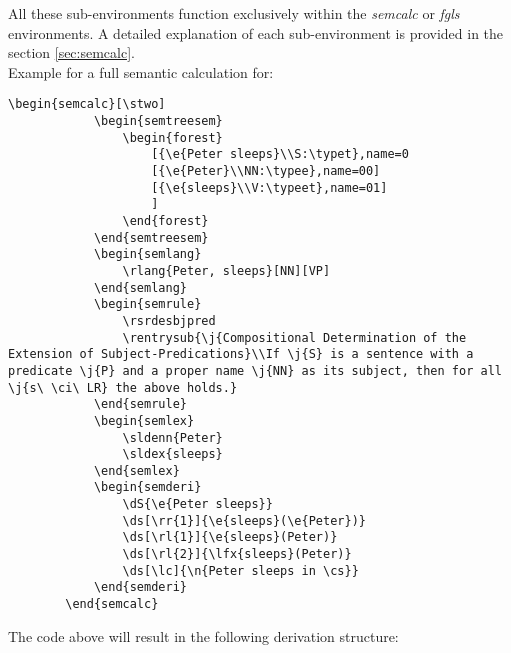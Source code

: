 \documentclass[10pt, a4paper]{article}
\begin{document}
	All these sub-environments function exclusively within the \textit{semcalc} or \textit{fgls} environments. A detailed ex\-pla\-na\-ti\-on of each sub-environment is provided in the section \ref{sec:semcalc}.
	\\Example for a full semantic calculation for: 
	\begin{lstlisting}[style=B]
		\begin{semcalc}[\stwo]
			\begin{semtreesem}
				\begin{forest}
					[{\e{Peter sleeps}\\S:\typet},name=0
					[{\e{Peter}\\NN:\typee},name=00]
					[{\e{sleeps}\\V:\typeet},name=01]
					]
				\end{forest}
			\end{semtreesem}
			\begin{semlang}
				\rlang{Peter, sleeps}[NN][VP]
			\end{semlang}
			\begin{semrule}
				\rsrdesbjpred
				\rentrysub{\j{Compositional Determination of the Extension of Subject-Predications}\\If \j{S} is a sentence with a predicate \j{P} and a proper name \j{NN} as its subject, then for all \j{s\ \ci\ LR} the above holds.}
			\end{semrule}
			\begin{semlex}
				\sldenn{Peter}
				\sldex{sleeps}
			\end{semlex}
			\begin{semderi}
				\dS{\e{Peter sleeps}}
				\ds[\rr{1}]{\e{sleeps}(\e{Peter})}
				\ds[\rl{1}]{\e{sleeps}(Peter)}
				\ds[\rl{2}]{\lfx{sleeps}(Peter)}
				\ds[\lc]{\n{Peter sleeps in \cs}}
			\end{semderi}
		\end{semcalc}
	\end{lstlisting}
	The code above will result in the following derivation structure:
\end{document}

